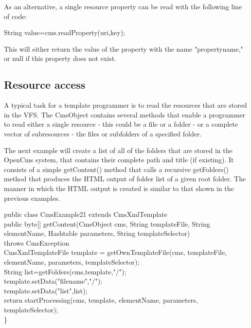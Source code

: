 As an alternative, a single resource property can be read with the
following line of code:

{\code String value=cms.readProperty(uri,key);}

This will either return the value of the property with the name
"propertyname," or null if this property does not exist.

\subsection{Resource access}

A typical task for a template programmer is to read the resources that
are stored in the VFS. The {\name CmsObject} contains several methods that
enable a programmer to read either a single resource - this could be a
file or a folder - or a complete vector of subresources - the files or
subfolders of a specified folder.

The next example will create a list of all of the folders that are
stored in the OpenCms system, that contains their complete path and
title (if existing). It consists of a simple {\meth getContent()} method that calls a
recursive {\meth getFolders()} method that produces the HTML output of folder
list of a given root folder. The manner in which the HTML output is
created is similar to that shown in the previous examples.

\begin{java}
public class CmsExample21 extends CmsXmlTemplate\\ 
public byte[] getContent(CmsObject cms, String templateFile, String\\
elementName, Hashtable parameters, String templateSelector)\\
throws CmsException\\ 
CmsXmlTemplateFile template = getOwnTemplateFile(cms, templateFile,\\
elementName, parameters, templateSelector);\\
\jtabc        String list=getFolders(cms,template,"/");\\
\jtabc        template.setData("filename","/");\\
\jtabc        template.setData("list",list);\\

return startProcessing(cms, template, elementName, parameters,\\
templateSelector);\\
\}\\
\end{java}

